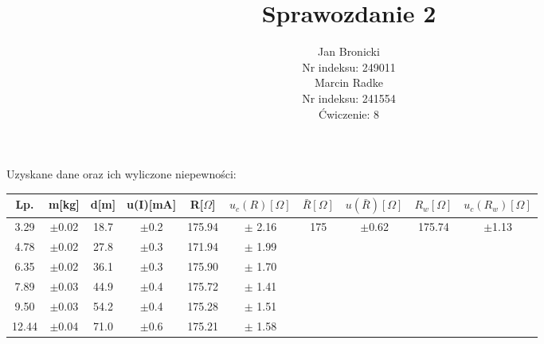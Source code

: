 \documentclass{article}
\title{Sprawozdanie 2}
\author{Jan Bronicki \\
Nr indeksu: 249011\\
Marcin Radke\\
Nr indeksu: 241554\\
Ćwiczenie: 8}
\date{}
\begin{document}
\maketitle
\begin{table}[h]
    Uzyskane dane oraz ich wyliczone niepewności:\\
    \renewcommand{\arraystretch}{1.3}
\begin{tabular}{ |c|c|c|c|c|c|c|c|c|c| }
    \hline
    Lp.&m[kg]&d[m]&u(I)[mA]&R[$\Omega$]&$u_c(R)[\Omega]$&$\bar{R}[\Omega]$&$u(\bar{R})[\Omega]$&$R_w[\Omega]$&$u_c(R_w)[\Omega]$ \\
    \hline \hline
    3.29&$\pm$0.02&18.7&$\pm$0.2&175.94&$\pm$ 2.16& \multirow{6}{*}{175}&\multirow{6}{*}{$\pm$0.62}&\multirow{6}{*}{175.74}&\multirow{6}{*}{$\pm$1.13}\\ 
    \cline{1-6}

    4.78&$\pm$0.02&27.8&$\pm$0.3&171.94&$\pm$ 1.99&&&&\\ 
    \cline{1-6}
  
    6.35&$\pm$0.02&36.1&$\pm$0.3&175.90&$\pm$ 1.70&&&&\\ 
    \cline{1-6}

    7.89&$\pm$0.03&44.9&$\pm$0.4&175.72&$\pm$ 1.41&&&&\\ 
    \cline{1-6}

    9.50&$\pm$0.03&54.2&$\pm$0.4&175.28&$\pm$ 1.51&&&&\\ 
    \cline{1-6}
    
    12.44&$\pm$0.04&71.0&$\pm$0.6&175.21&$\pm$ 1.58&&&&\\ 

    \hline
\end{tabular}
\label{tabular: t}
\end{table}
\end{document}
